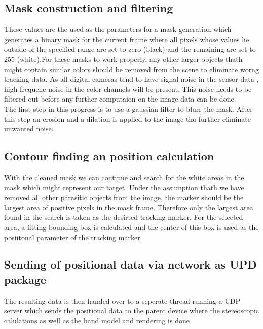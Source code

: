 \subsection{Mask construction and filtering}
These values are the used as the parameters for a mask generation which generates a binary mask for the current frame where all pixels whose values lie outside of the specified range are set to zero (black) and the remaining are set to 255 (white).For these masks to work properly, any other larger objects thath might contain similar colors should be removed from the scene to eliminate worng tracking data. As all digital cameras tend to have signal noise in the sensor data , high frequenc  noise in the color channels will be present. This noise needs to be filtered out before any further computaion on the image data can be done.\\
The first step in this progress is to use a gaussian filter to blurr the mask. After this step an erosion and a dilation is applied to the image tho further eliminate unwanted noise.
\subsection{Contour finding an position calculation}
With the cleaned mask we can continue and search for the white areas in the mask which might represent our target. Under the assumption thath we have removed all other parasitic objects from the image, the marker should be the largest area of positive pixels in the mask frame. Therefore only the largest area found in the search is taken as the desirted tracking marker. For the selected area, a fitting bounding box is calculated and the center of this box is used as the posiitonal parameter of the tracking marker.
\subsection{Sending of positional data via network as UPD package}
The resulting data is then handed over to a seperate thread running a UDP server which sends the positional data to the parent device where the stereoscopic calulations as well as the hand model and rendering is done



 




